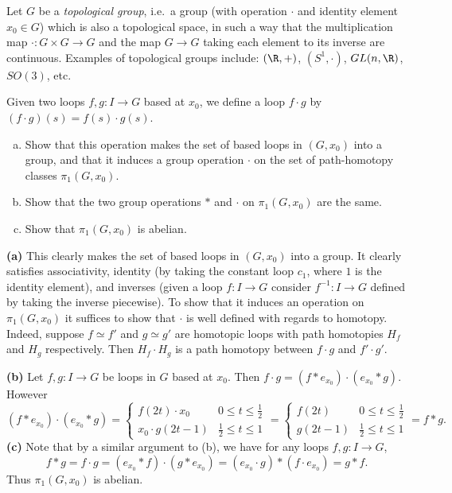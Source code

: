 \documentclass[11pt,letterpaper]{article}
\begin{document}
\begin{problem}
    Let $G$ be a {\em topological group}, i.e.\ a group (with operation $\cdot$ and identity element $x_0\in G$) which is also a topological space, in such a way that the multiplication map $\cdot:G\times G\to G$ and the map $G\to G$ taking each element to its inverse are continuous.  Examples of topological groups include: $(\R,+)$, $(S^1,\cdot)$, $GL(n,\R)$, $SO(3)$, etc. 

    \medskip
    Given two loops $f,g:I\to G$ based at $x_0$, we define a loop $f\cdot g$ by $(f\cdot g)(s) = f(s)\cdot g(s)$.
    \begin{enumerate}[(a)]
        \item Show that this operation makes the set of based loops in $(G,x_0)$ into a group, and that it induces a group operation $\cdot$ on the set of path-homotopy classes $\pi_1(G,x_0)$.
        \item Show that the two group operations $*$ and $\cdot$ on $\pi_1(G,x_0)$ are the same.
        \item Show that $\pi_1(G, x_0)$ is abelian.
    \end{enumerate}
\end{problem}

\begin{solution}
    \textbf{(a)} This clearly makes the set of based loops in $(G,x_0)$ into a group. It clearly satisfies associativity, identity (by taking the constant loop $c_1$, where $1$ is the identity element), and inverses (given a loop $f : I\to G$ consider $f^{-1} : I \to G$ defined by taking the inverse piecewise). To show that it induces an operation on $\pi_1(G,x_0)$ it suffices to show that $\cdot$ is well defined with regards to homotopy. Indeed, suppose $f\simeq f'$ and $g\simeq g'$ are homotopic loops with path homotopies $H_f$ and $H_g$ respectively. Then $H_f\cdot H_g$ is a path homotopy between $f\cdot g$ and $f'\cdot g'$.
    
    \textbf{(b)} Let $f,g : I \to G$ be loops in $G$ based at $x_0$. Then $f\cdot g = (f*e_{x_0})\cdot (e_{x_0}*g)$. However
    \[
        (f*e_{x_0})\cdot (e_{x_0}*g)=\begin{cases}
            f(2t)\cdot x_0 &0\leq t\leq \frac{1}{2}\\
            x_0\cdot g(2t-1)& \frac{1}{2}\leq t\leq 1
        \end{cases}
        =\begin{cases}
            f(2t)&0\leq t\leq \frac{1}{2}\\
            g(2t-1)& \frac{1}{2}\leq t\leq 1
        \end{cases}=f*g
    .\] 
    \textbf{(c)} Note that by a similar argument to (b), we have for any loops $f,g : I \to G$,
    \[
        f*g=f\cdot g=(e_{x_0} * f)\cdot (g * e_{x_0}) = (e_{x_0} \cdot g)*(f\cdot e_{x_0}) = g * f
    .\] 
    Thus $\pi_1(G,x_0)$ is abelian.
\end{solution}
\end{document}
